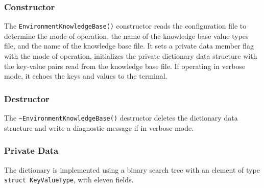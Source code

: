 \documentclass{CSSRforAfrica}
\begin{document}
\subsubsection{Constructor}

The  {\tt\small EnvironmentKnowledgeBase()} constructor reads the configuration file to determine the mode of operation, the name of the knowledge base value types file, and  the name of the knowledge base file. It sets a private data member flag with the mode of operation, initializes the private dictionary data structure with the key-value pairs read from the knowledge base file. If operating in verbose mode, it echoes the keys and values to the terminal.


\subsubsection{Destructor}

The  {\tt\small \verb+~+EnvironmentKnowledgeBase()} destructor deletes the dictionary data structure and write a diagnostic message if in verbose mode.


\subsubsection{Private Data}

The dictionary is implemented using a binary search tree with an element of type {\small \tt struct KeyValueType}, with eleven fields.
\end{document}
